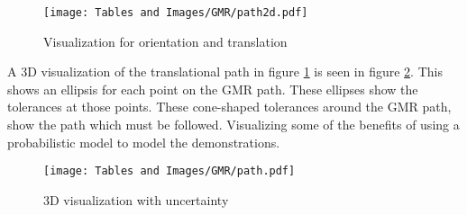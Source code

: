 \begin{figure}[!htb]
    \centering
    \texttt{[image: Tables and Images/GMR/path2d.pdf]}
    \caption{Visualization for orientation and translation}
    \label{fig:GMR:cartesian2D}
\end{figure}

A 3D visualization of the translational path in figure \ref{fig:GMR:cartesian2D} is seen in figure \ref{fig:GMR:clearance}.
This shows an ellipsis for each point on the GMR path. These ellipses show the tolerances at those points.
These cone-shaped tolerances around the GMR path, show the path which must be followed.
Visualizing some of the benefits of using a probabilistic model to model the demonstrations.

\begin{figure}[H]
    \centering
    \texttt{[image: Tables and Images/GMR/path.pdf]}
    \caption{3D visualization with uncertainty}
    \label{fig:GMR:clearance}
\end{figure}
